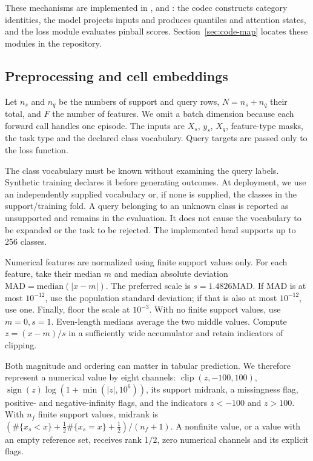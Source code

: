 \documentclass[11pt]{article}
\begin{document}
These mechanisms are implemented in ,  and : the codec constructs category identities, the model projects inputs and produces quantiles and attention states, and the loss module evaluates pinball scores. Section~\ref{sec:code-map} locates these modules in the repository.


\subsection{Preprocessing and cell embeddings}
\label{sec:codec}

Let $n_s$ and $n_q$ be the numbers of support and query rows, $N=n_s+n_q$ their total, and $F$ the number of features. We omit a batch dimension because each forward call handles one episode. The inputs are $X_s$, $y_s$, $X_q$, feature-type masks, the task type and the declared class vocabulary. Query targets are passed only to the loss function.

The class vocabulary must be known without examining the query labels. Synthetic training declares it before generating outcomes. At deployment, we use an independently supplied vocabulary or, if none is supplied, the classes in the support/training fold. A query belonging to an unknown class is reported as unsupported and remains in the evaluation. It does not cause the vocabulary to be expanded or the task to be rejected. The implemented head supports up to 256 classes.

Numerical features are normalized using finite support values only. For each feature, take their median $m$ and median absolute deviation $\mathrm{MAD}=\mathrm{median}(|x-m|)$. The preferred scale is $s=1.4826\mathrm{MAD}$. If MAD is at most $10^{-12}$, use the population standard deviation; if that is also at most $10^{-12}$, use one. Finally, floor the scale at $10^{-3}$. With no finite support values, use $m=0,s=1$. Even-length medians average the two middle values. Compute $z=(x-m)/s$ in a sufficiently wide accumulator and retain indicators of clipping.

Both magnitude and ordering can matter in tabular prediction. We therefore represent a numerical value by eight channels: $\operatorname{clip}(z,-100,100)$, $\operatorname{sign}(z)\log(1+\min(|z|,10^6))$, its support midrank, a missingness flag, positive- and negative-infinity flags, and the indicators $z<-100$ and $z>100$. With $n_f$ finite support values, midrank is $(\#\{x_s<x\}+\tfrac12\#\{x_s=x\}+\tfrac12)/(n_f+1)$. A nonfinite value, or a value with an empty reference set, receives rank $1/2$, zero numerical channels and its explicit flags.
\end{document}
